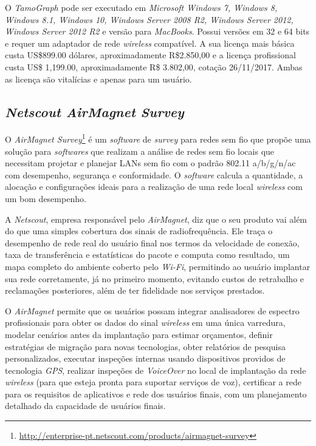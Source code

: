 \documentclass[
	12pt,				%
	twoside,			%
	a4paper,			%
	english,			%
	french,				%
	spanish,			%
	brazil				%
	]{abntex2}
\begin{document}
O \emph{TamoGraph} pode ser executado em \emph{Microsoft Windows 7,
Windows 8, Windows 8.1, Windows 10, Windows Server 2008 R2, Windows
Server 2012, Windows Server 2012 R2} e versão para \emph{MacBooks}.
Possui versões em 32 e 64 bits e requer um adaptador de rede
\emph{wireless} compatível. A sua licença mais básica custa US\$899.00
dólares, aproximadamente R\$2.850,00 e a licença profissional custa US\$
1,199.00, aproximadamente R\$ 3.802,00, cotação 26/11/2017. Ambas as
licença são vitalícias e apenas para um usuário.

\subsection{\texorpdfstring{\emph{Netscout AirMagnet
Survey}}{Netscout AirMagnet Survey}}\label{netscout-airmagnet-survey}

O \emph{AirMagnet Survey}\footnote{\url{http://enterprise-pt.netscout.com/products/airmagnet-survey}}
é um \emph{software} de \emph{survey} para redes sem fio que propõe uma
solução para \emph{softwares} que realizam a análise de redes sem fio
locais que necessitam projetar e planejar LANs sem fio com o padrão
802.11 a/b/g/n/ac com desempenho, segurança e conformidade. O
\emph{software} calcula a quantidade, a alocação e configurações ideais
para a realização de uma rede local \emph{wireless} com um bom
desempenho.

A \emph{Netscout}, empresa responsável pelo \emph{AirMagnet}, diz que o
seu produto vai além do que uma simples cobertura dos sinais de
radiofrequência. Ele traça o desempenho de rede real do usuário final
nos termos da velocidade de conexão, taxa de transferência e
estatísticas do pacote e computa como resultado, um mapa completo do
ambiente coberto pelo \emph{Wi-Fi}, permitindo ao usuário implantar sua
rede corretamente, já no primeiro momento, evitando custos de retrabalho
e reclamações posteriores, além de ter fidelidade nos serviços
prestados.

O \emph{AirMagnet} permite que os usuários possam integrar analisadores
de espectro profissionais para obter os dados do sinal \emph{wireless}
em uma única varredura, modelar cenários antes da implantação para
estimar orçamentos, definir estratégias de migração para novas
tecnologias, obter relatórios de pesquisa personalizados, executar
inspeções internas usando dispositivos providos de tecnologia
\emph{GPS}, realizar inspeções de \emph{VoiceOver} no local de
implantação da rede \emph{wireless} (para que esteja pronta para
suportar serviços de voz), certificar a rede para os requisitos de
aplicativos e rede dos usuários finais, com um planejamento detalhado da
capacidade de usuários finais.
\end{document}
